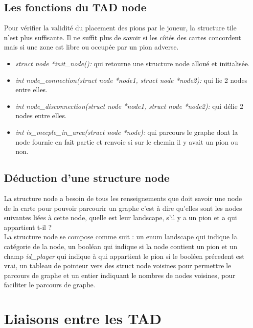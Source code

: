 \documentclass[12pt]{article}
\begin{document}
\subsection{Les fonctions du TAD node}

Pour vérifier la validité du placement des pions par le joueur, la structure tile n'est plus suffisante. Il ne suffit plus de savoir si les côtés des cartes concordent mais si une zone est libre ou occupée par un pion adverse. 

\begin{itemize}
\item \textit{struct node *init\_node():} qui retourne une structure node alloué et initialisée.\\
\item \textit{int node\_connection(struct node *node1, struct node *node2):} qui lie 2 nodes entre elles.\\
\item \textit{int node\_disconnection(struct node *node1, struct node *node2):} qui délie 2 nodes entre elles.\\
\item \textit{int is\_meeple\_in\_area(struct node *node):} qui parcours le graphe dont la node fournie en fait partie et renvoie si sur le chemin il y avait un pion ou non.

\end{itemize}

\subsection{Déduction d'une structure node}

La structure node a besoin de tous les renseignements que doit savoir une node de la carte pour pouvoir parcourir un graphe c'est à dire qu'elles sont les nodes suivantes liées à cette node, quelle est leur landscape, s'il y a un pion et a qui appartient t-il ?\\

La structure node se compose comme suit : un enum landscape qui indique la catégorie de la node, un booléan qui indique si la node contient un pion et un champ \textit{id\_player} qui indique à qui appartient le pion si le booléen précedent est vrai, un tableau de pointeur vers des struct node voisines pour permettre le parcours de graphe et un entier indiquant le nombres de nodes voisines, pour faciliter le parcours de graphe.

\section{Liaisons entre les TAD}
\end{document}
